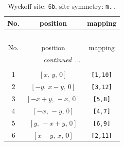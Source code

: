 \documentclass[fleqn,8pt]{jsarticle}
\begin{document}
\begin{longtable}{ccc}
\caption{Wyckoff site: {\tt 6b}, site symmetry: {\tt m..}}
 \\
 \hline \hline
No. & position & mapping \\ \hline \endfirsthead

\multicolumn{2}{l}{\tablename\ \thetable{}} \\
 \hline \hline
No. & position & mapping \\ \hline \endhead

 \hline \hline
\multicolumn{2}{r}{\footnotesize\it continued ...} \\ \endfoot

 \hline \hline
\multicolumn{2}{r}{} \\ \endlastfoot

1 & $\left[ x,\, y,\, 0 \right]$ & {\tt [1,10]} \\ \hline
2 & $\left[ - y,\, x - y,\, 0 \right]$ & {\tt [3,12]} \\ \hline
3 & $\left[ - x + y,\, - x,\, 0 \right]$ & {\tt [5,8]} \\ \hline
4 & $\left[ - x,\, - y,\, 0 \right]$ & {\tt [4,7]} \\ \hline
5 & $\left[ y,\, - x + y,\, 0 \right]$ & {\tt [6,9]} \\ \hline
6 & $\left[ x - y,\, x,\, 0 \right]$ & {\tt [2,11]} \\
\end{longtable}
\renewcommand{\arraystretch}{1.2}
\end{document}
